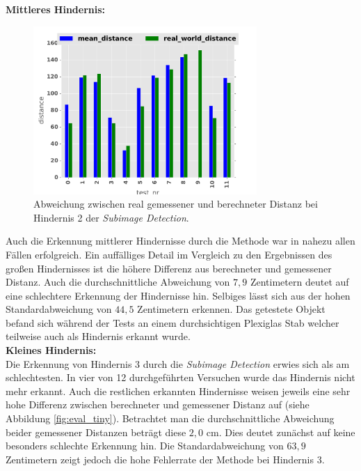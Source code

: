 \pagebreak
\noindent
\textbf{Mittleres Hindernis:}\\
\begin{figure}[h]
	\centering
	\includegraphics[width=8.5cm]{img/evaluation/diagrams/sub_medium_bar}
	\caption{Abweichung zwischen real gemessener und berechneter Distanz bei Hindernis 2 der \emph{Subimage Detection}.}
    \label{fig:eval_medium}
\end{figure}

\noindent
Auch die Erkennung mittlerer Hindernisse durch die Methode war in nahezu allen Fällen erfolgreich. Ein auffälliges Detail im Vergleich zu den Ergebnissen des großen Hindernisses ist die höhere Differenz aus berechneter und gemessener Distanz. Auch die durchschnittliche Abweichung von $7,9$ Zentimetern deutet auf eine schlechtere Erkennung der Hindernisse hin. Selbiges lässt sich aus der hohen Standardabweichung von $44,5$ Zentimetern erkennen. Das getestete Objekt befand sich während der Tests an einem durchsichtigen Plexiglas Stab welcher teilweise auch als Hindernis erkannt wurde.\\

\noindent
\textbf{Kleines Hindernis:}\\
\noindent
Die Erkennung von Hindernis 3 durch die \emph{Subimage Detection	} erwies sich als am schlechtesten. In vier von 12 durchgeführten Versuchen wurde das Hindernis nicht mehr erkannt. Auch die restlichen erkannten Hindernisse weisen jeweils eine sehr hohe Differenz zwischen berechneter und gemessener Distanz auf (siehe Abbildung \ref{fig:eval_tiny}). Betrachtet man die durchschnittliche Abweichung beider gemessener Distanzen beträgt diese $2,0$ cm. Dies deutet zunächst auf keine besonders schlechte Erkennung hin. Die Standardabweichung von $63,9$ Zentimetern zeigt jedoch die hohe Fehlerrate der Methode bei Hindernis 3.

